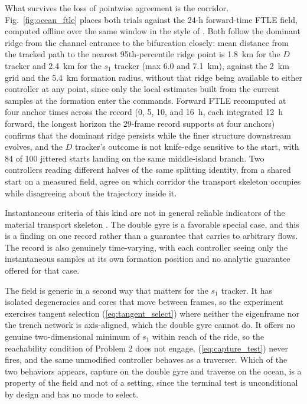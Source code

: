 \documentclass[lettersize,journal]{IEEEtran}
\begin{document}
What survives the loss of pointwise agreement is the corridor.
Fig.~\ref{fig:ocean_ftle} places both trials against the 24-h forward-time
FTLE field, computed offline over the same window in the style of
\cite{15}. Both follow the dominant ridge from the channel entrance to the
bifurcation closely: mean distance from the tracked path to the nearest
95th-percentile ridge point is 1.8~km for the $D$ tracker and 2.4~km for
the $s_1$ tracker (max 6.0 and 7.1~km), against the 2~km grid and the
5.4~km formation radius, without that ridge being available to either
controller at any point, since only the local estimates built from the
current samples at the formation enter the commands. Forward FTLE
recomputed at four anchor times across the record (0, 5, 10, and 16~h,
each integrated 12~h forward, the longest horizon the 29-frame record
supports at four anchors) confirms that the dominant ridge
persists while the finer structure downstream evolves, and the $D$
tracker's outcome is not knife-edge sensitive to the start, with 84 of 100
jittered starts landing on the same middle-island branch. Two controllers
reading different halves of the same splitting identity, from a shared
start on a measured field, agree on which corridor the transport skeleton
occupies while disagreeing about the trajectory inside it.

Instantaneous criteria of this kind are not in general reliable indicators
of the material transport skeleton \cite{23}. The double gyre is a
favorable special case, and this is a finding on one record rather than a
guarantee that carries to arbitrary flows. The record is also genuinely
time-varying, with each controller seeing only the instantaneous samples at
its own formation position and no analytic guarantee offered for that case.

The field is generic in a second way that matters for the $s_1$ tracker. It
has isolated degeneracies and cores that move between frames, so the
experiment exercises tangent selection (\ref{eq:tangent_select}) where
neither the eigenframe nor the trench network is axis-aligned, which the
double gyre cannot do. It offers no genuine two-dimensional minimum of
$s_1$ within reach of the ride, so the reachability condition of Problem 2
does not engage, (\ref{eq:capture_test}) never fires, and the same
unmodified controller behaves as a traverser. Which of the two behaviors
appears, capture on the double gyre and traverse on the ocean, is a
property of the field and not of a setting, since the terminal test is
unconditional by design and has no mode to select.
\end{document}
